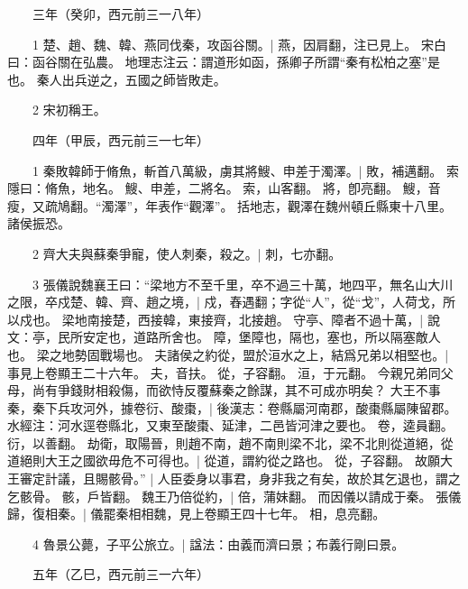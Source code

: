 　　三年（癸卯，西元前三一八年）

　　1 楚、趙、魏、韓、燕同伐秦，攻函谷關。|{
	燕，因肩翻，注已見上。
	宋白曰：函谷關在弘農。
	地理志注云：謂道形如函，孫卿子所謂“秦有松柏之塞”是也。
}
秦人出兵逆之，五國之師皆敗走。


　　2 宋初稱王。


　　四年（甲辰，西元前三一七年）

　　1 秦敗韓師于脩魚，斬首八萬級，虜其將䱸、申差于濁澤。|{
	敗，補邁翻。
	索隱曰：脩魚，地名。
	䱸、申差，二將名。
	索，山客翻。
	將，卽亮翻。
	䱸，音瘦，又疏鳩翻。“濁澤”，年表作“觀澤”。
	括地志，觀澤在魏州頓丘縣東十八里。
}
諸侯振恐。


　　2 齊大夫與蘇秦爭寵，使人刺秦，殺之。|{
	刺，七亦翻。
}

　　3 張儀說魏襄王曰：“梁地方不至千里，卒不過三十萬，地四平，無名山大川之限，卒戍楚、韓、齊、趙之境，|{
	戍，舂遇翻；字從“人”，從“戈”，人荷戈，所以戍也。
	梁地南接楚，西接韓，東接齊，北接趙。
}
守亭、障者不過十萬，|{
	說文：亭，民所安定也，道路所舍也。
	障，堡障也，隔也，塞也，所以隔塞敵人也。
}
梁之地勢固戰場也。
	夫諸侯之約從，盟於洹水之上，結爲兄弟以相堅也。|{
	事見上卷顯王二十六年。
	夫，音扶。
	從，子容翻。
	洹，于元翻。
}
今親兄弟同父母，尚有爭錢財相殺傷，而欲恃反覆蘇秦之餘謀，其不可成亦明矣？
大王不事秦，秦下兵攻河外，據卷衍、酸棗，|{
	後漢志：卷縣屬河南郡，酸棗縣屬陳留郡。
	水經注：河水逕卷縣北，又東至酸棗、延津，二邑皆河津之要也。
	卷，逵員翻。
	衍，以善翻。
}
劫衛，取陽晉，則趙不南，趙不南則梁不北，梁不北則從道絕，從道絕則大王之國欲毋危不可得也。|{
	從道，謂約從之路也。
	從，子容翻。
}
故願大王審定計議，且賜骸骨。” |{
	人臣委身以事君，身非我之有矣，故於其乞退也，謂之乞骸骨。
	骸，戶皆翻。
}
魏王乃倍從約，|{
	倍，蒲妹翻。
}
而因儀以請成于秦。
	張儀歸，復相秦。|{
	儀罷秦相相魏，見上卷顯王四十七年。
	相，息亮翻。
}

　　4 魯景公薨，子平公旅立。|{
	諡法：由義而濟曰景；布義行剛曰景。
}

　　五年（乙巳，西元前三一六年）

